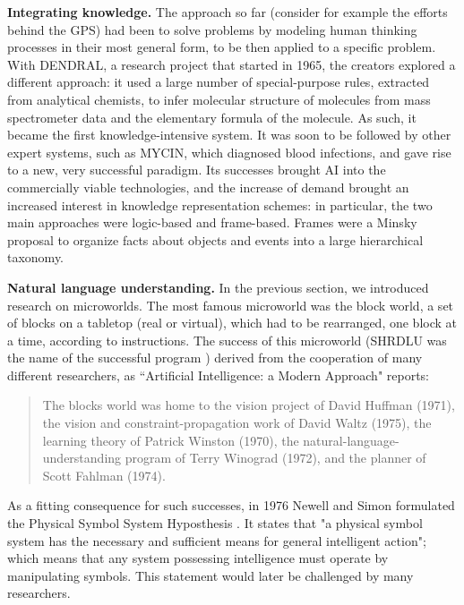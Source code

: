 \documentclass[../main.tex]{subfiles}
\begin{document}
\vspace{4pt}
\textbf{Integrating knowledge.}
The approach so far (consider for example the efforts behind the GPS) had been to solve problems by modeling human thinking processes in their most general form, to be then applied to a specific problem. With DENDRAL, a research project that started in 1965, the creators explored a different approach: it used a large number of special-purpose rules, extracted from analytical chemists, to infer molecular structure of molecules from mass spectrometer data and the elementary formula of the molecule. As such, it became the first knowledge-intensive system.
It was soon to be followed by other expert systems, such as MYCIN, which diagnosed blood infections, and gave rise to a new, very successful paradigm. Its successes brought AI into the commercially viable technologies, and the increase of demand brought an increased interest in knowledge representation schemes: in particular, the two main approaches were logic-based and frame-based. Frames were a Minsky proposal\cite{minskyFrameworkRepresentingKnowledge1975} to organize facts about objects and events into a large hierarchical taxonomy.

\vspace{4pt}
\textbf{Natural language understanding.}
In the previous section, we introduced research on microworlds.
The most famous microworld was the block world, a set of blocks on a tabletop (real or virtual), which had to be rearranged, one block at a time, according to instructions. The success of this microworld (SHRDLU was the name of the successful program \cite{winogradProceduresRepresentationData1971}) derived from the cooperation of many different researchers, as ``Artificial Intelligence: a Modern Approach" reports:

\begin{quote}
    The blocks world was home to the vision project of David Huffman (1971), the vision and constraint-propagation work of David Waltz (1975), the learning theory of Patrick Winston (1970), the natural-language-understanding program of Terry Winograd (1972), and the planner of Scott Fahlman (1974).
\end{quote}\cite{russellArtificialIntelligenceModern2002}
As a fitting consequence for such successes, in 1976 Newell and Simon formulated the Physical Symbol System Hyposthesis \cite{newellComputerScienceEmpirical1976}. It states that "a physical symbol system has the necessary and sufficient means for general intelligent action"; which means that any system possessing intelligence must operate by manipulating symbols. This statement would later be challenged by many researchers.
\end{document}
